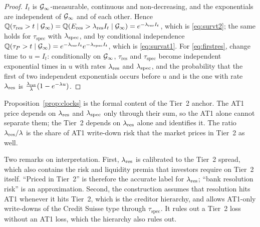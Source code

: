 \begin{proof}
$I_t$ is $\mathcal{G}_\infty$-measurable, continuous and non-decreasing, and the exponentials are
independent of $\mathcal{G}_\infty$ and of each other. Hence
$\mathbb{Q}(\tau_{\mathrm{res}}>t\mid\mathcal{G}_\infty)=\mathbb{Q}(E_{\mathrm{res}}>\lambda_{\mathrm{res}} I_t\mid\mathcal{G}_\infty)=e^{-\lambda_{\mathrm{res}} I_t}$,
which is \eqref{eq:survt2}; the same holds for $\tau_{\mathrm{spec}}$ with $\lambda_{\mathrm{spec}}$, and by
conditional independence $\mathbb{Q}(\tau_P>t\mid\mathcal{G}_\infty)=e^{-\lambda_{\mathrm{res}} I_t}e^{-\lambda_{\mathrm{spec}} I_t}$,
which is \eqref{eq:survat1}. For \eqref{eq:firstres}, change time to
$u=I_t$: conditionally on $\mathcal{G}_\infty$, $\tau_{\mathrm{res}}$ and $\tau_{\mathrm{spec}}$
become independent exponential times in $u$ with rates $\lambda_{\mathrm{res}}$ and $\lambda_{\mathrm{spec}}$, and the
probability that the first of two independent exponentials occurs before $u$ and is the
one with rate $\lambda_{\mathrm{res}}$ is $\frac{\lambda_{\mathrm{res}}}{\lambda}(1-e^{-\lambda u})$.
\end{proof}

Proposition~\ref{prop:clocks} is the formal content of the Tier~2 anchor. The AT1 price
depends on $\lambda_{\mathrm{res}}$ and $\lambda_{\mathrm{spec}}$ only through their sum, so the AT1 alone cannot separate
them; the Tier~2 depends on $\lambda_{\mathrm{res}}$ alone and identifies it. The ratio $\lambda_{\mathrm{res}}/\lambda$ is
the share of AT1 write-down risk that the market prices in Tier~2 as well.

Two remarks on interpretation. First, $\lambda_{\mathrm{res}}$ is calibrated to the Tier~2 spread, which
also contains the risk and liquidity premia that investors require on Tier~2 itself.
``Priced in Tier~2'' is therefore the accurate label for $\lambda_{\mathrm{res}}$; ``bank resolution
risk'' is an approximation. Second, the construction assumes that resolution hits AT1
whenever it hits Tier~2, which is the creditor hierarchy, and allows AT1-only write-downs
of the Credit Suisse type through $\tau_{\mathrm{spec}}$. It rules out a Tier~2 loss
without an AT1 loss, which the hierarchy also rules out.
